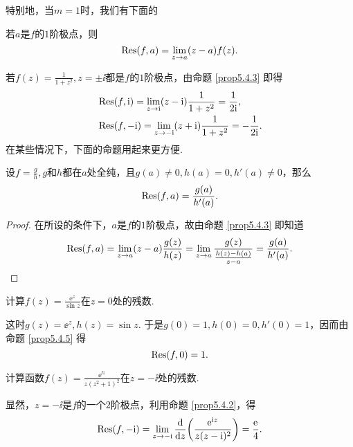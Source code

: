 特别地，当$m=1$时，我们有下面的
\begin{prop}\label{prop5.4.3}
若$a$是$f$的$1$阶极点，则
\[\operatorname*{Res}(f,a)=\lim_{z\to a}(z-a)f(z).\]
\end{prop}

\begin{example}\label{exam5.4.4}
若$f(z)=\frac1{1+z^2},z=\pm\ii$都是$f$的$1$阶极点，由命题 \ref{prop5.4.3} 即得
\begin{align*}
&\operatorname*{Res}(f,\mathrm i)=\lim_{z\to \mathrm i}(z-\mathrm i)\frac1{1+z^2}=\frac1{2\mathrm i},\\
&\operatorname*{Res}(f,-\mathrm i)=\lim_{z\to-\mathrm i}(z+\mathrm i)\frac1{1+z^2}=-\frac1{2\mathrm i}.
\end{align*}
在某些情况下，下面的命题用起来更方便.
\end{example}

\begin{prop}\label{prop5.4.5}
设$f=\frac gh,g$和$h$都在$a$处全纯，且$g(a)\ne0,h(a)=0,h'(a)\ne0$，那么
\[\operatorname*{Res}(f,a)=\frac{g(a)}{h'(a)}.\]
\end{prop}
\begin{proof}
在所设的条件下，$a$是$f$的$1$阶极点，故由命题 \ref{prop5.4.3} 即知道
\begin{equation*}
\operatorname*{Res}(f,a)=\lim_{z\to a}(z-a)\frac{g(z)}{h(z)}
=\lim_{z\to a}\frac{g(z)}{\frac{h(z)-h(a)}{z-a}}=\frac{g(a)}{h'(a)}.
\end{equation*}
\end{proof}

\begin{example}\label{exam5.4.6}
计算$f(z)=\frac{\ee^z}{\sin z}$在$z=0$处的残数.
\end{example}
\begin{solution}
这时$g(z)=\ee^z,h(z)=\sin z$. 于是$g(0)=1,h(0)=0,h'(0)=1$，因而由命题 \ref{prop5.4.5} 得
\begin{equation*}
\operatorname*{Res}(f,0)=1.
\end{equation*}
\end{solution}

\begin{example}
计算函数$f(z)=\frac{\ee^{\ii z}}{z(z^2+1)^2}$在$z=-\ii$处的残数.
\end{example}
\begin{solution}
  显然，$z=-\ii$是$f$的一个$2$阶极点，利用命题 \ref{prop5.4.2}，得
  \begin{equation*}
  \operatorname*{Res}(f,-\mathrm i)=\lim_{z\to-\mathrm i}\frac{\mathop{}\!\mathrm d}{\mathop{}\!\mathrm dz}\bigg(\frac{\operatorname{\!\!\;\mathrm e}^{\mathrm i z}}{z(z-\mathrm i)^2}\bigg)
  =\frac{\operatorname{\!\!\;\mathrm e}}4.
  \end{equation*}
\end{solution}

